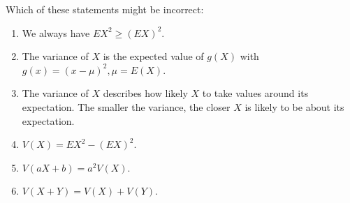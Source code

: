 \documentclass[poll_tutorial_format]{subfiles}
\begin{document}
	
	\begin{exercise}
		Which of these statements might be incorrect: 
		\begin{enumerate}
			\item We always have $EX^2 \geq (EX)^2$.
			\item The variance of $X$ is the expected value of $g(X)$ with $g(x)=(x-\mu)^2, \mu=E(X)$. 
			\item The variance of $X$ describes how likely $X$ to take values around its expectation. The smaller the variance, the closer $X$ is likely to be about its expectation.
			\item $V(X)=EX^2-(EX)^2$. 
			\item $V(aX+b)=a^2V(X)$.
			\item $V(X+Y)=V(X)+V(Y)$.
		\end{enumerate}
	\end{exercise}
	
	 
	
	
	
\end{document}
